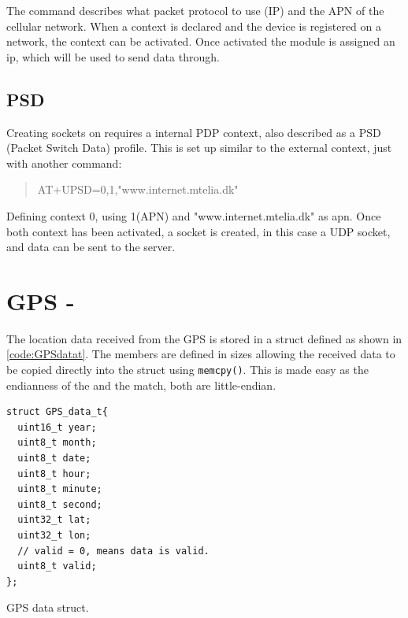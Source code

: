 The command describes what packet protocol to use (IP) and the APN of the cellular network. When a context is declared and the device is registered on a network, the context can be activated. Once activated the module is assigned an ip, which will be used to send data through.

\subsection{PSD}
Creating sockets on \SARA requires a internal PDP context, also described as a PSD (Packet Switch Data) profile. This is set up similar to the external context, just with another command:
\begin{quote}
	AT+UPSD=0,1,"www.internet.mtelia.dk"
\end{quote}
Defining context 0, using 1(APN) and "www.internet.mtelia.dk" as apn. Once both context has been activated, a socket is created, in this case a UDP socket, and data can be sent to the server.

\section{GPS - \GPS}
\label{sec:impl:gps}
The location data received from the \GPS GPS is stored in a struct defined as shown in \cref{code:GPSdatat}.
The members are defined in sizes allowing the received data to be copied directly into the struct using \texttt{memcpy()}.
This is made easy as the endianness of the \GPS and the \SAMD match, both are little-endian.

\begin{listing}
	\begin{verbatim}
struct GPS_data_t{
  uint16_t year;
  uint8_t month;
  uint8_t date;
  uint8_t hour;
  uint8_t minute;
  uint8_t second;
  uint32_t lat;
  uint32_t lon;
  // valid = 0, means data is valid.
  uint8_t valid;
};
	\end{verbatim}
	\caption{GPS data struct.}
	\label{code:GPSdatat}
\end{listing}

\FloatBarrier